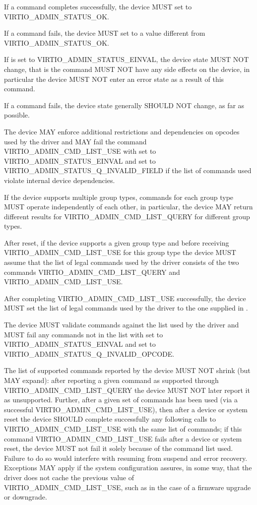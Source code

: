 If a command completes successfully, the device MUST set
 to VIRTIO_ADMIN_STATUS_OK.

If a command fails, the device MUST set
 to a value different from VIRTIO_ADMIN_STATUS_OK.

If  is set to VIRTIO_ADMIN_STATUS_EINVAL, the
device state MUST NOT change, that is the command MUST NOT have
any side effects on the device, in particular the device MUST NOT
enter an error state as a result of this command.

If a command fails, the device state generally SHOULD NOT change,
as far as possible.

The device MAY enforce additional restrictions and dependencies on
opcodes used by the driver and MAY fail the command
VIRTIO_ADMIN_CMD_LIST_USE with  set to VIRTIO_ADMIN_STATUS_EINVAL
and  set to VIRTIO_ADMIN_STATUS_Q_INVALID_FIELD
if the list of commands used violate internal device dependencies.

If the device supports multiple group types, commands for each group
type MUST operate independently of each other, in particular,
the device MAY return different results for VIRTIO_ADMIN_CMD_LIST_QUERY
for different group types.

After reset, if the device supports a given group type
and before receiving VIRTIO_ADMIN_CMD_LIST_USE for this group type
the device MUST assume
that the list of legal commands used by the driver consists of
the two commands VIRTIO_ADMIN_CMD_LIST_QUERY and VIRTIO_ADMIN_CMD_LIST_USE.

After completing VIRTIO_ADMIN_CMD_LIST_USE successfully,
the device MUST set the list of legal commands used by the driver
to the one supplied in .

The device MUST validate commands against the list used by
the driver and MUST fail any commands not in the list with
 set to VIRTIO_ADMIN_STATUS_EINVAL
and  set to
VIRTIO_ADMIN_STATUS_Q_INVALID_OPCODE.

The list of supported commands reported by the device MUST NOT
shrink (but MAY expand): after reporting a given command as
supported through VIRTIO_ADMIN_CMD_LIST_QUERY the device MUST NOT
later report it as unsupported.  Further, after a given set of
commands has been used (via a successful
VIRTIO_ADMIN_CMD_LIST_USE), then after a device or system reset
the device SHOULD complete successfully any following calls to
VIRTIO_ADMIN_CMD_LIST_USE with the same list of commands; if this
command VIRTIO_ADMIN_CMD_LIST_USE fails after a device or system
reset, the device MUST not fail it solely because of the command
list used.  Failure to do so would interfere with resuming from
suspend and error recovery. Exceptions MAY apply if the system
configuration assures, in some way, that the driver does not
cache the previous value of VIRTIO_ADMIN_CMD_LIST_USE,
such as in the case of a firmware upgrade or downgrade.

